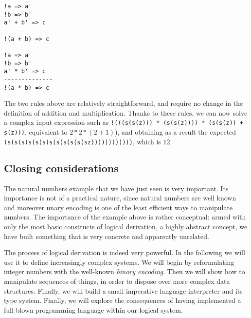 \begin{lstlisting}
!a => a'
!b => b'
a' + b' => c
--------------
!(a + b) => c

!a => a'
!b => b'
a' * b' => c
--------------
!(a * b) => c
\end{lstlisting}

The two rules above are relatively straightforward, and require no change in the definition of addition and multiplication. Thanks to these rules, we can now solve a complex input expression such as \texttt{!(((s(s(z))) * (s(s(z)))) * (s(s(z)) + s(z)))}, equivalent to $2 * 2 * (2 + 1)$), and obtaining as a result the expected \texttt{(s(s(s(s(s(s(s(s(s(s(s(sz))))))))))))}, which is $12$.


\subsection{Closing considerations}
The natural numbers example that we have just seen is very important. Its importance is not of a practical nature, since natural numbers are well known and moreover unary encoding is one of the least efficient ways to manipulate numbers. The importance of the example above is rather conceptual: armed with only the most basic constructs of logical derivation, a highly abstract concept, we have built something that is very concrete and apparently unrelated.

The process of logical derivation is indeed very powerful. In the following we will use it to define increasingly complex systems. We will begin by reformulating integer numbers with the well-known \textit{binary encoding}. Then we will show how to manipulate sequences of things, in order to dispose over more complex data structures. Finally, we will build a small imperative language interpreter and its type system. Finally, we will explore the consequences of having implemented a full-blown programming language within our logical system.
